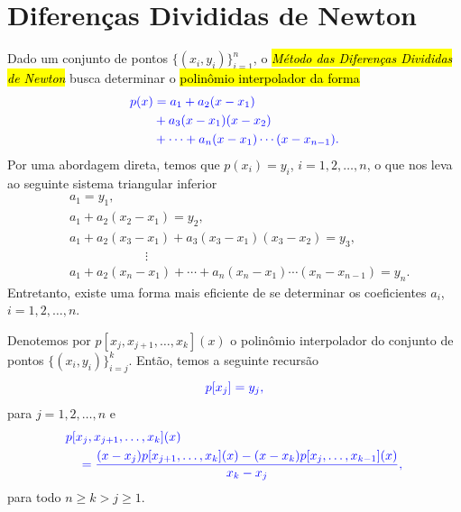\section{Diferenças Divididas de Newton}\label{cap_interp_sec_difdiv}

Dado um conjunto de pontos $\{(x_i, y_i)\}_{i=1}^n$, o \hl{\emph{Método das Diferenças Divididas de Newton}}{\newton} busca determinar o \hl{polinômio interpolador da forma}
\begin{equation}\color{blue}\begin{aligned}
    p(x) &= a_1 + a_2(x-x_1) \\
    &+ a_3(x-x_1)(x-x_2)\\
    &+ \cdots + a_{n}(x-x_1) \cdots (x-x_{n-1}).
  \end{aligned}
\end{equation}
Por uma abordagem direta, temos que $p(x_i)=y_i$, $i=1, 2, \dotsc, n$, o que nos leva ao seguinte sistema triangular inferior
\begin{equation}
  \begin{aligned}
    & a_1 = y_1, \\
    & a_1 + a_2(x_2-x_1) = y_2, \\
    & a_1 + a_2(x_3-x_1) + a_3(x_3-x_1)(x_3-x_2) = y_3, \\
    &\text{}\qquad\qquad\qquad\vdots \\
    & a_1 + a_2(x_n-x_1) + \cdots + a_{n}(x_n-x_1) \cdots (x_n-x_{n-1}) = y_n.
  \end{aligned}
\end{equation}
Entretanto, existe uma forma mais eficiente de se determinar os coeficientes $a_i$, $i=1, 2, \dotsc, n$.

Denotemos por $p[x_j, x_{j+1}, \dotsc, x_{k}](x)$ o polinômio interpolador do conjunto de pontos $\{(x_i, y_i)\}_{i=j}^k$. Então, temos a seguinte recursão
\begin{equation}\label{cap_interp_sec_difdiv:eq:interp_parc1}\color{blue}p[x_j] = y_j,
\end{equation}
para $j=1, 2, \dotsc, n$ e
\begin{equation}\label{cap_interp_sec_difdiv:eq:interp_parc2}\color{blue}\begin{aligned}
    &p[x_j, x_{j+1}, \ldots, x_k](x)\\
    &\quad = \frac{(x-x_j)p[x_{j+1},\dotsc,x_k](x)-(x-x_k)p[x_j,\dotsc,x_{k-1}](x)}{x_k-x_j},
  \end{aligned}
\end{equation}
para todo $n\geq k > j \geq 1$.

